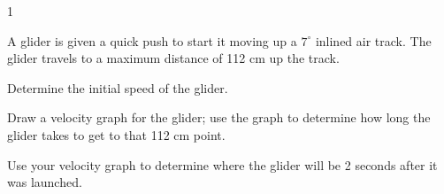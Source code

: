 
\AddToShipoutPicture*{\BackgroundPic}

\addtocounter {ProbNum} {1}

 
{\bf \Large{}} A glider is given a quick push to start it moving up a ${7^{\circ}}$ inlined air track. The glider travels to a maximum distance of 112 cm up the track.

\bigskip
Determine the initial speed of the glider.
 
\vfill
\vfill

Draw a velocity graph for the glider; use the graph to determine how long the glider takes to get to that 112 cm point.
\vfill

Use your velocity graph to determine where the glider will be 2 seconds after it was launched.
\vspace{30 mm}
\newpage
